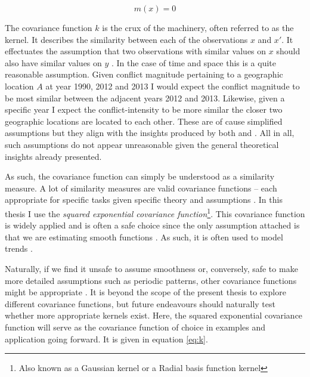 \documentclass[a4paper]{article}
\begin{document}
\[
m(x) = 0 \tag{6} \label{eq:m}
\]

The covariance function $k$ is the crux of the machinery, often referred to as the kernel. It describes the similarity between each of the observations $x$ and $x'$. It effectuates the assumption that two observations with similar values on $x$ should also have similar values on $y$ \cite[79]{williams2006gaussian}. In the case of time and space this is a quite reasonable assumption. Given conflict magnitude pertaining to a geographic location $A$ at year 1990, 2012 and 2013 I would expect the conflict magnitude to be most similar between the adjacent years 2012 and 2013. Likewise, given a specific year I expect the conflict-intensity to be more similar the closer two geographic locations are located to each other. These are of cause simplified assumptions but they align with the insights produced by both \cite{weidmann_ward_2010predicting} and \cite{schutte2011diffusion}. All in all, such assumptions do not appear unreasonable given the general theoretical insights already presented.\par 

As such, the covariance function can simply be understood as a similarity measure. A lot of similarity measures are valid covariance functions -- each appropriate for specific tasks given specific theory and assumptions \citep[79]{williams2006gaussian}. In this thesis I use the \emph{squared exponential covariance function}\footnote{Also known as a Gaussian kernel or a Radial basis function kernel}. This covariance function is widely applied and is often a safe choice since the only assumption attached is that we are estimating smooth functions \citep[84]{williams2006gaussian}. As such, it is often used to model trends \cite[119]{williams2006gaussian}.\par 



Naturally, if we find it unsafe to assume smoothness or, conversely, safe to make more detailed assumptions such as periodic patterns, other covariance functions might be appropriate \citep[502-503]{Gelman_2013}. It is beyond the scope of the present thesis to explore different covariance functions, but future endeavours should naturally test whether more appropriate kernels exist. Here, the squared exponential covariance function will serve as the covariance function of choice in examples and application going forward. It is given in equation \ref{eq:k}.\par
\end{document}
